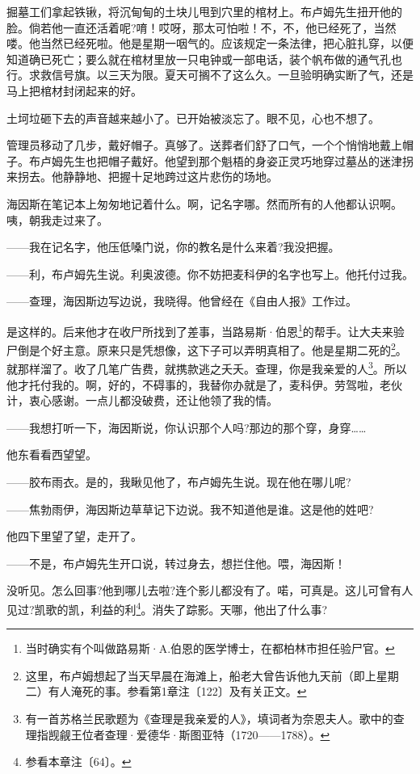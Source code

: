 \par 掘墓工们拿起铁锹，将沉甸甸的土块儿甩到穴里的棺材上。布卢姆先生扭开他的脸。倘若他一直还活着呢?唷！哎呀，那太可怕啦！不，不，他已经死了，当然喽。他当然已经死啦。他是星期一咽气的。应该规定一条法律，把心脏扎穿，以便知道确已死亡；要么就在棺材里放一只电钟或一部电话，装个帆布做的通气孔也行。求救信号旗。以三天为限。夏天可搁不了这么久。一旦验明确实断了气，还是马上把棺材封闭起来的好。
\par 土坷垃砸下去的声音越来越小了。已开始被淡忘了。眼不见，心也不想了。
\par 管理员移动了几步，戴好帽子。真够了。送葬者们舒了口气，一个个悄悄地戴上帽子。布卢姆先生也把帽子戴好。他望到那个魁梧的身姿正灵巧地穿过墓丛的迷津拐来拐去。他静静地、把握十足地跨过这片悲伤的场地。
\par 海因斯在笔记本上匆匆地记着什么。啊，记名字哪。然而所有的人他都认识啊。咦，朝我走过来了。
\par ——我在记名字，他压低嗓门说，你的教名是什么来着?我没把握。
\par ——利，布卢姆先生说。利奥波德。你不妨把麦科伊的名字也写上。他托付过我。
\par ——查理，海因斯边写边说，我晓得。他曾经在《自由人报》工作过。
\par 是这样的。后来他才在收尸所找到了差事，当路易斯·伯恩\footnote{当时确实有个叫做路易斯·A.伯恩的医学博士，在都柏林市担任验尸官。}的帮手。让大夫来验尸倒是个好主意。原来只是凭想像，这下子可以弄明真相了。他是星期二死的\footnote{这里，布卢姆想起了当天早晨在海滩上，船老大曾告诉他九天前（即上星期二）有人淹死的事。参看第1章注〔122〕及有关正文。}。就那样溜了。收了几笔广告费，就携款逃之夭夭。查理，你是我亲爱的人\footnote{有一首苏格兰民歌题为《查理是我亲爱的人》，填词者为奈恩夫人。歌中的查理指觊觎王位者查理·爱德华·斯图亚特（1720——1788）。}。所以他才托付我的。啊，好的，不碍事的，我替你办就是了，麦科伊。劳驾啦，老伙计，衷心感谢。一点儿都没破费，还让他领了我的情。
\par ——我想打听一下，海因斯说，你认识那个人吗?那边的那个穿，身穿……
\par 他东看看西望望。
\par ——胶布雨衣。是的，我瞅见他了，布卢姆先生说。现在他在哪儿呢?
\par ——焦勃雨伊，海因斯边草草记下边说。我不知道他是谁。这是他的姓吧?
\par 他四下里望了望，走开了。
\par ——不是，布卢姆先生开口说，转过身去，想拦住他。喂，海因斯！
\par 没听见。怎么回事?他到哪儿去啦?连个影儿都没有了。喏，可真是。这儿可曾有人见过?凯歌的凯，利益的利\footnote{参看本章注〔64〕。}。消失了踪影。天哪，他出了什么事?
